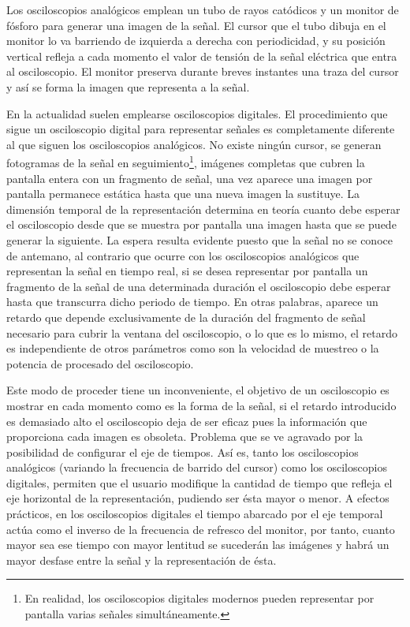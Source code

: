Los osciloscopios analógicos emplean un tubo de rayos catódicos y un monitor de fósforo para generar una imagen de la señal. El cursor que el tubo dibuja en el monitor lo va barriendo de izquierda a derecha con periodicidad, y su posición vertical refleja a cada momento el valor de tensión de la señal eléctrica que entra al osciloscopio. El monitor preserva durante breves instantes una traza del cursor y así se forma la imagen que representa a la señal.\par
En la actualidad suelen emplearse osciloscopios digitales. El procedimiento que sigue un osciloscopio digital para representar señales es completamente diferente al que siguen los osciloscopios analógicos. No existe ningún cursor, se generan fotogramas de la señal en seguimiento\footnote{En realidad, los osciloscopios digitales modernos pueden representar por pantalla varias señales simultáneamente.}, imágenes completas que cubren la pantalla entera con un fragmento de señal, una vez aparece una imagen por pantalla permanece estática hasta que una nueva imagen la sustituye. La dimensión temporal de la representación determina en teoría cuanto debe esperar el osciloscopio desde que se muestra por pantalla una imagen hasta que se puede generar la siguiente. La espera resulta evidente puesto que la señal no se conoce de antemano, al contrario que ocurre con los osciloscopios analógicos que representan la señal en tiempo real, si se desea representar por pantalla un fragmento de la señal de una determinada duración el osciloscopio debe esperar hasta que transcurra dicho periodo de tiempo. En otras palabras, aparece un retardo que depende exclusivamente de la duración del fragmento de señal necesario para cubrir la ventana del osciloscopio, o lo que es lo mismo, el retardo es independiente de otros parámetros como son la velocidad de muestreo o la potencia de procesado del osciloscopio.\par
Este modo de proceder tiene un inconveniente, el objetivo de un osciloscopio es mostrar en cada momento como es la forma de la señal, si el retardo introducido es demasiado alto el osciloscopio deja de ser eficaz pues la información que proporciona cada imagen es obsoleta. Problema que se ve agravado por la posibilidad de configurar el eje de tiempos. Así es, tanto los osciloscopios analógicos (variando la frecuencia de barrido del cursor) como los osciloscopios digitales, permiten que el usuario modifique la cantidad de tiempo que refleja el eje horizontal de la representación, pudiendo ser ésta mayor o menor. A efectos prácticos, en los osciloscopios digitales el tiempo abarcado por el eje temporal actúa como el inverso de la frecuencia de refresco del monitor, por tanto, cuanto mayor sea ese tiempo con mayor lentitud se sucederán las imágenes y habrá un mayor desfase entre la señal y la representación de ésta.


